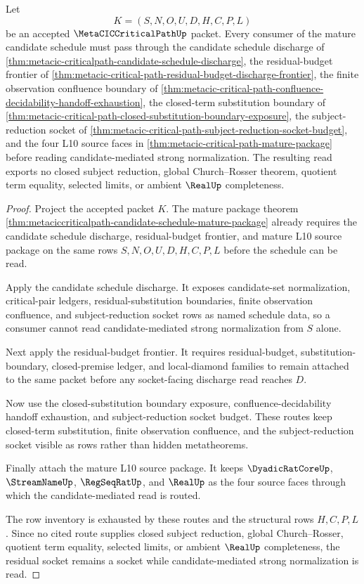 \begin{theorem}
\label{thm:metaciccriticalpath-residual-socket-consumer-surface}
Let
$$
K=(S,N,O,U,D,H,C,P,L)
$$
be an accepted $\MetaCICCriticalPathUp$ packet. Every consumer of the mature candidate schedule must pass through the candidate schedule discharge of \autoref{thm:metacic-criticalpath-candidate-schedule-discharge}, the residual-budget frontier of \autoref{thm:metacic-critical-path-residual-budget-discharge-frontier}, the finite observation confluence boundary of \autoref{thm:metacic-critical-path-confluence-decidability-handoff-exhaustion}, the closed-term substitution boundary of \autoref{thm:metacic-critical-path-closed-substitution-boundary-exposure}, the subject-reduction socket of \autoref{thm:metacic-critical-path-subject-reduction-socket-budget}, and the four L10 source faces in \autoref{thm:metacic-critical-path-mature-package} before reading candidate-mediated strong normalization. The resulting read exports no closed subject reduction, global Church--Rosser theorem, quotient term equality, selected limits, or ambient $\RealUp$ completeness.
\end{theorem}
\begin{proof}
Project the accepted packet $K$. The mature package theorem \autoref{thm:metaciccriticalpath-candidate-schedule-mature-package} already requires the candidate schedule discharge, residual-budget frontier, and mature L10 source package on the same rows $S,N,O,U,D,H,C,P,L$ before the schedule can be read.

Apply the candidate schedule discharge. It exposes candidate-set normalization, critical-pair ledgers, residual-substitution boundaries, finite observation confluence, and subject-reduction socket rows as named schedule data, so a consumer cannot read candidate-mediated strong normalization from $S$ alone.

Next apply the residual-budget frontier. It requires residual-budget, substitution-boundary, closed-premise ledger, and local-diamond families to remain attached to the same packet before any socket-facing discharge read reaches $D$.

Now use the closed-substitution boundary exposure, confluence-decidability handoff exhaustion, and subject-reduction socket budget. These routes keep closed-term substitution, finite observation confluence, and the subject-reduction socket visible as rows rather than hidden metatheorems.

Finally attach the mature L10 source package. It keeps $\DyadicRatCoreUp$, $\StreamNameUp$, $\RegSeqRatUp$, and $\RealUp$ as the four source faces through which the candidate-mediated read is routed.

The row inventory is exhausted by these routes and the structural rows $H,C,P,L$. Since no cited route supplies closed subject reduction, global Church--Rosser, quotient term equality, selected limits, or ambient $\RealUp$ completeness, the residual socket remains a socket while candidate-mediated strong normalization is read.
\end{proof}

